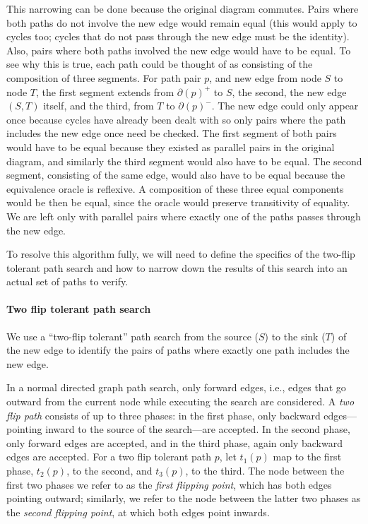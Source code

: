 \documentclass[sigplan]{acmart}
\begin{document}
This narrowing can be done because the original diagram commutes.
Pairs where both paths do not involve the new edge would remain equal (this would apply to cycles too; cycles that do not pass through the new edge must be the identity).
Also, pairs where both paths involved the new edge would have to be equal.
To see why this is true, each path could be thought of as consisting of the composition of three segments.
For path pair $p$, and new edge from node $S$ to node $T$, the first segment extends from $\partial(p)^+$ to $S$, the second, the new edge $(S, T)$ itself, and the third, from $T$ to $\partial(p)^-$.
The new edge could only appear once because cycles have already been dealt with so only pairs where the path includes the new edge once need be checked.
The first segment of both pairs would have to be equal because they existed as parallel pairs in the original diagram, and similarly the third segment would also have to be equal.
The second segment, consisting of the same edge, would also have to be equal because the equivalence oracle is reflexive.
A composition of these three equal components would be then be equal, since the oracle would preserve transitivity of equality.
We are left only with parallel pairs where exactly one of the paths passes through the new edge.

To resolve this algorithm fully, we will need to define the specifics of the two-flip tolerant path search and how to narrow down the results of this search into an actual set of paths to verify.

\paragraph{Two flip tolerant path search}
We use a ``two-flip tolerant'' path search from the source ($S$) to the sink ($T$) of the new edge to identify the pairs of paths where exactly one path includes the new edge.

In a normal directed graph path search, only forward edges, i.e., edges that go outward from the current node while executing the search are considered.
A \textit{two flip path} consists of up to three phases: in the first phase, only backward edges---pointing inward to the source of the search---are accepted.
In the second phase, only forward edges are accepted, and in the third phase, again only backward edges are accepted.
For a two flip tolerant path $p$, let $t_1(p)$ map to the first phase, $t_2(p)$, to the second, and $t_3(p)$, to the third.
The node between the first two phases we refer to as the \textit{first flipping point}, which has both edges pointing outward; similarly, we refer to the node between the latter two phases as the \textit{second flipping point}, at which both edges point inwards.
\end{document}
